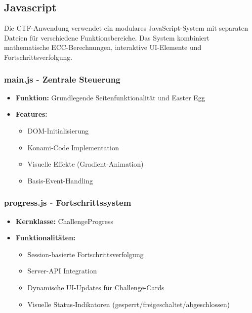 \documentclass{article}
\begin{document}
\subsection{Javascript}
Die CTF-Anwendung verwendet ein modulares JavaScript-System mit separaten Dateien für verschiedene Funktionsbereiche. Das System kombiniert mathematische ECC-Berechnungen, interaktive UI-Elemente und Fortschrittsverfolgung.\\

\subsubsection{main.js - Zentrale Steuerung}
\begin{itemize}
    \item \textbf{Funktion:} Grundlegende Seitenfunktionalität und Easter Egg
    \item \textbf{Features:}
    \begin{itemize}
        \item DOM-Initialisierung
        \item Konami-Code Implementation
        \item Visuelle Effekte (Gradient-Animation)
        \item Basis-Event-Handling
    \end{itemize}
\end{itemize}

\subsubsection{progress.js - Fortschrittssystem}
\begin{itemize}
    \item \textbf{Kernklasse:} ChallengeProgress
    \item \textbf{Funktionalitäten:}
    \begin{itemize}
        \item Session-basierte Fortschrittsverfolgung
        \item Server-API Integration
        \item Dynamische UI-Updates für Challenge-Cards
        \item Visuelle Status-Indikatoren (gesperrt/freigeschaltet/abgeschlossen)
    \end{itemize}
\end{itemize}
\end{document}
